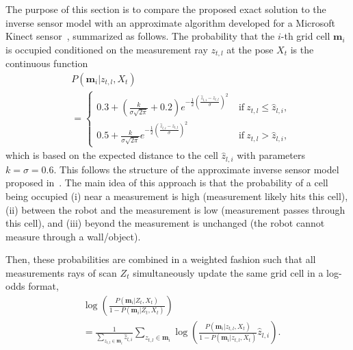 \documentclass[letterpaper, 10pt, conference]{ieeeconf}
\begin{document}

The purpose of this section is to compare the proposed exact solution to the inverse sensor model with an approximate algorithm developed for a Microsoft Kinect sensor~\cite{PirRutBisSch11,KhoElb12}, summarized as follows. The probability that the $i$-th grid cell $\mathbf{m}_i$ is occupied conditioned on the measurement ray $z_{t,l}$ at the pose $X_t$ is the continuous function
\begin{align*}
&P(\mathbf{m}_i|z_{t,l},X_t)\nonumber\\&=\begin{cases}
0.3+(\frac{k}{\sigma\sqrt{2\pi}}+0.2)e^{-\frac12\left(\frac{\hat z_{l,i}-z_{t,l}}{\sigma}\right)^2}\ &\text{if}\ z_{t,l}\leq \hat z_{l,i},
\\
0.5+\frac{k}{\sigma\sqrt{2\pi}}e^{-\frac12\left(\frac{\hat z_{l,i}-z_{t,l}}{\sigma}\right)^2}\ &\text{if}\ z_{t,l}>\hat z_{l,i},
\end{cases}
\end{align*}
which is based on the expected distance to the cell $\hat z_{l,i}$ with parameters $k=\sigma=0.6$. This follows the structure of the approximate inverse sensor model proposed in~\cite{And09}. The main idea of this approach is that the probability of a cell being occupied (i) near a measurement is high (measurement likely hits this cell), (ii) between the robot and the measurement is low (measurement passes through this cell), and (iii) beyond the measurement is unchanged (the robot cannot measure through a wall/object). 

Then, these probabilities are combined in a weighted fashion such that all measurements rays of scan $Z_t$ simultaneously update the same grid cell in a log-odds format,
\begin{align*}
&\log\left(\frac{P(\mathbf{m}_i|Z_{t},X_t)}{1-P(\mathbf{m}_i|Z_{t},X_t)}\right)
\nonumber\\&=
\frac1{\sum_{z_{t,l}\in\mathbf{m}_i}\hat z_{l,i}}\sum_{z_{t,l}\in\mathbf{m}_i}\log\left(\frac{P(\mathbf{m}_i|z_{t,l},X_t)}{1-P(\mathbf{m}_i|z_{t,l},X_t)}\hat z_{l,i}\right).
\end{align*}
\end{document}
